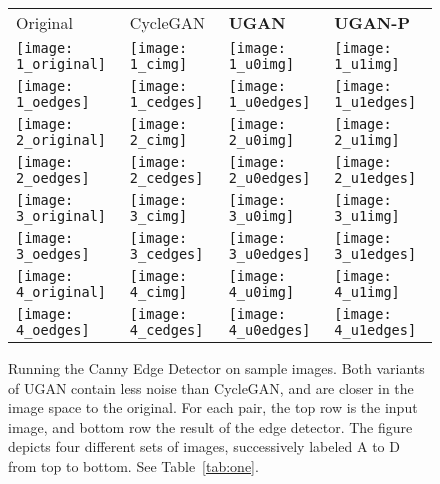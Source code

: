 \begin{figure}[!ht]
\centering
\footnotesize
\begin{tabular}{p{1.6cm} p{1.6cm} p{1.6cm} p{1.6cm}}
   Original & CycleGAN & \textbf{UGAN} & \textbf{UGAN-P} \\
   \texttt{[image: 1\_original]} &
   \texttt{[image: 1\_cimg]} &
   \texttt{[image: 1\_u0img]} &
   \texttt{[image: 1\_u1img]} \\ [-1ex]
   \texttt{[image: 1\_oedges]} &
   \texttt{[image: 1\_cedges]} &
   \texttt{[image: 1\_u0edges]} &
   \texttt{[image: 1\_u1edges]} \\

   \texttt{[image: 2\_original]} &
   \texttt{[image: 2\_cimg]} &
   \texttt{[image: 2\_u0img]} &
   \texttt{[image: 2\_u1img]} \\ [-1ex]
   \texttt{[image: 2\_oedges]} &
   \texttt{[image: 2\_cedges]} &
   \texttt{[image: 2\_u0edges]} &
   \texttt{[image: 2\_u1edges]} \\

   \texttt{[image: 3\_original]} &
   \texttt{[image: 3\_cimg]} &
   \texttt{[image: 3\_u0img]} &
   \texttt{[image: 3\_u1img]} \\ [-1ex]
   \texttt{[image: 3\_oedges]} &
   \texttt{[image: 3\_cedges]} &
   \texttt{[image: 3\_u0edges]} &
   \texttt{[image: 3\_u1edges]} \\
   
   \texttt{[image: 4\_original]} &
   \texttt{[image: 4\_cimg]} &
   \texttt{[image: 4\_u0img]} &
   \texttt{[image: 4\_u1img]} \\ [-1ex]
   \texttt{[image: 4\_oedges]} &
   \texttt{[image: 4\_cedges]} &
   \texttt{[image: 4\_u0edges]} &
   \texttt{[image: 4\_u1edges]} \\
\end{tabular}
\vspace{-2mm}
\caption{\small{Running the Canny Edge Detector on sample images. Both variants of UGAN contain less noise than CycleGAN,
and are closer in the image space to the original. For each pair, the top row is the input image, and bottom row
the result of the edge detector. The figure depicts four different sets of images, successively labeled A to D from top to 
bottom. See Table~\ref{tab:one}.}}
\label{fig:canny_samples}
\vspace{-5mm}
\end{figure}

